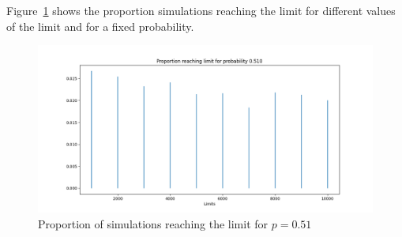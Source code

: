 Figure~\ref{f.random_walk-02} shows the proportion simulations reaching the limit for different values of the limit and for a fixed probability.
\begin{figure}
\begin{center}
\includegraphics[width=\textwidth]{random_walk-02}
\end{center}
\caption{Proportion of simulations reaching the limit for $p=0.51$}\label{f.random_walk-02}
\end{figure}
